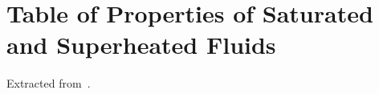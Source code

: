 
\chapter{Table of Properties of Saturated and Superheated Fluids}\label{Appendix:Saturated_SH_Tables}

Extracted from~\cite{Moran_Book}.

  
